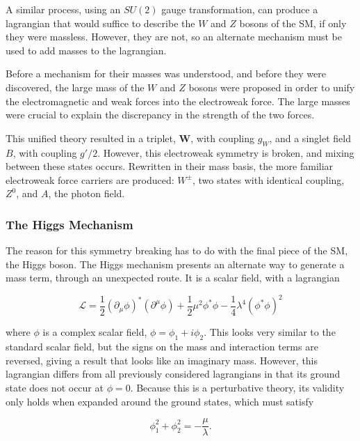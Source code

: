 A similar process, using an $SU(2)$ gauge transformation, can produce a lagrangian that would suffice to describe the $W$ and $Z$ bosons of the \ac{SM}, if only they were massless. However, they are not, so an alternate mechanism must be used to add masses to the lagrangian. 

Before a mechanism for their masses was understood, and before they were discovered, the large mass of the $W$ and $Z$ bosons were proposed in order to unify the electromagnetic and weak forces into the electroweak force. The large masses were crucial to explain the discrepancy in the strength of the two forces. 

This unified theory resulted in a triplet, $\bm{W}$, with coupling $g_W$, and a singlet field $B$, with coupling $g'/2$. However, this electroweak symmetry is broken, and mixing between these states occurs. Rewritten in their mass basis, the more familiar electroweak force carriers are produced: $W^\pm$, two states with identical coupling, $Z^0$, and $A$, the photon field. 

\subsubsection{The Higgs Mechanism}

The reason for this symmetry breaking has to do with the final piece of the \ac{SM}, the Higgs boson. The Higgs mechanism presents an alternate way to generate a mass term, through an unexpected route. It is a scalar field, with a lagrangian 

\begin{equation}
\mathcal{L} = \frac{1}{2}(\partial_\mu\phi)^*(\partial^\mu\phi) + \frac{1}{2}\mu^2\phi^*\phi - \frac{1}{4}\lambda^4(\phi^*\phi)^2
\end{equation}

where $\phi$ is a complex scalar field, $\phi = \phi_1 + i\phi_2$. This looks very similar to the standard scalar field, but the signs on the mass and interaction terms are reversed, giving a result that looks like an imaginary mass. However, this lagrangian differs from all previously considered lagrangians in that its ground state does not occur at $\phi = 0$. Because this is a perturbative theory, its validity only holds when expanded around the ground states, which must satisfy

\begin{equation}
\phi_1^2 + \phi_2^2 = - \frac{\mu}{\lambda} . 
\end{equation}

